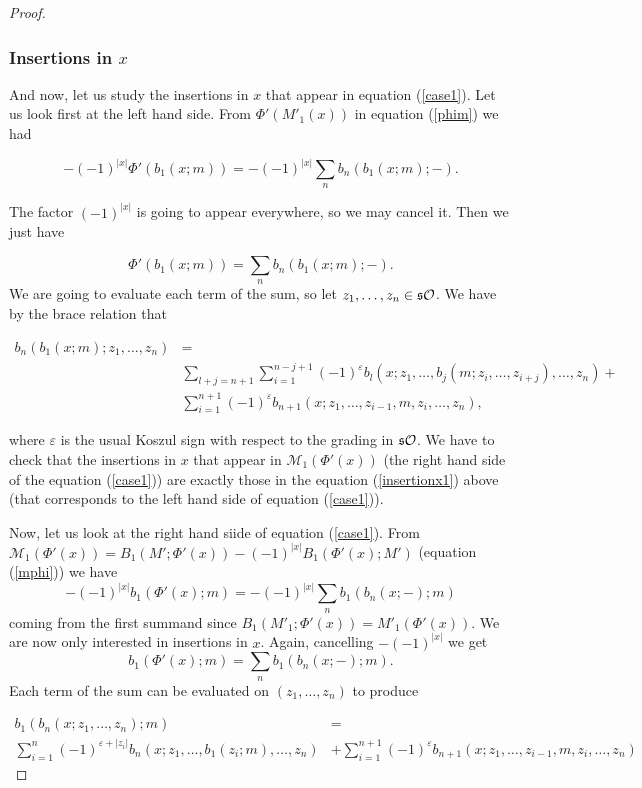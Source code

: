 \documentclass[join.tex]{subfiles}
\begin{document}
\begin{proof}
\subsubsection*{Insertions in $x$}

And now, let us study the insertions in $x$ that appear in equation (\ref{case1}). Let us look first at the left hand side. From $\Phi'(M'_1(x))$ in equation (\ref{phim}) we had 

\[-(-1)^{|x|}\Phi'(b_1(x;m))=-(-1)^{|x|}\sum_n b_n(b_1(x;m);-).\]

The factor $(-1)^{|x|}$ is going to appear everywhere, so we may cancel it. Then we just have

\[\Phi'(b_1(x;m))=\sum_n b_n(b_1(x;m);-).\]
We are going to evaluate each term of the sum, so let $z_1,\dots, z_n\in \mathfrak{s}{\mathcal O}$. We have by the brace relation that

\begin{align}\label{insertionx1}
b_n(b_1(x;m);z_1,\dots, z_n)&=\\
 &\sum_{l+j=n+1}\sum_{i=1}^{n-j+1}(-1)^{\varepsilon} b_l(x;z_1,\dots,b_j(m;z_{i},\dots, z_{i+j}),\dots, z_n)+\nonumber\\
 &\sum_{i=1}^{n+1}(-1)^{\varepsilon}b_{n+1}(x;z_1,\dots, z_{i-1},m,z_i,\dots, z_n),\nonumber
\end{align}

where $\varepsilon$ is the usual Koszul sign with respect to the grading in $\mathfrak{s}{\mathcal O}$. We have to check that the insertions in $x$ that appear in $\mathcal{M}_1(\Phi'(x))$ (the right hand side of the equation (\ref{case1})) are exactly those in the equation (\ref{insertionx1}) above (that corresponds to the left hand side of equation (\ref{case1})).

Now, let us look at the right hand siide of equation (\ref{case1}). From $\mathcal{M}_1(\Phi'(x))=B_1(M';\Phi'(x))-(-1)^{|x|}B_1(\Phi'(x);M')$ (equation (\ref{mphi})) we have 
\[-(-1)^{|x|}b_1(\Phi'(x);m)=-(-1)^{|x|}\sum_n b_1(b_n(x;-);m)\] 
coming from the first summand since $B_1(M'_1;\Phi'(x))=M'_1(\Phi'(x))$. We are now only interested in insertions in $x$. Again, cancelling $-(-1)^{|x|}$ we get
\[b_1(\Phi'(x);m)=\sum_n b_1(b_n(x;-);m).\] 
Each term of the sum can be evaluated on $(z_1,\dots, z_n)$ to produce

\begin{align}\label{insertionx2}
b_1(b_n(x;z_1, \dots, z_n);m)&=\\
\sum_{i=1}^n (-1)^{\varepsilon+|z_i|}b_n(x;z_1,\dots, b_1(z_i;m),\dots, z_n)&+\sum_{i=1}^{n+1} (-1)^{\varepsilon}b_{n+1}(x;z_1,\dots, z_{i-1},m,z_{i},\dots, z_n)\nonumber
\end{align}


\end{proof}
\end{document}
